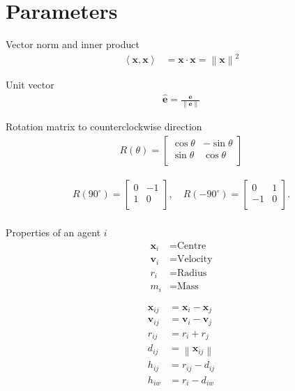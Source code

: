 \section{Parameters}

Vector norm and inner product
\begin{align}
\left\langle \mathbf{x}, \mathbf{x} \right\rangle &= \mathbf{x} \cdot \mathbf{x} = \left\| \mathbf{x}\right\|^{2}
\end{align}

Unit vector
\begin{align}
\hat{\mathbf{e}} = \frac{\mathbf{e}}{\left\|\mathbf{e}\right\|}
\end{align}

Rotation matrix to counterclockwise direction
\begin{align}
R(\theta) = \begin{bmatrix}\cos \theta & -\sin \theta \\\sin \theta & \cos \theta \\\end{bmatrix}
\end{align}

\begin{align}
R(90^{\circ}) = \begin{bmatrix}0 & -1 \\ 1 & 0 \\\end{bmatrix}, \quad R(-90^{\circ}) = \begin{bmatrix}0 & 1 \\ -1 & 0 \\\end{bmatrix}. \\
\end{align}

Properties of an agent $ i $
\begin{align}
\mathbf{x}_{i} &= \text{Centre} \\
\mathbf{v}_{i} &= \text{Velocity} \\
r_{i} &= \text{Radius} \\
m_{i} &= \text{Mass}
\end{align}

\begin{align}
\mathbf{x}_{ij} &= \mathbf{x}_{i} - \mathbf{x}_{j} \\
\mathbf{v}_{ij} &= \mathbf{v}_{i} - \mathbf{v}_{j} \\
r_{ij} &= r_{i} + r_{j} \\
d_{ij} &= \left\|\mathbf{x}_{ij}\right\| \\
h_{ij} &= r_{ij} - d_{ij} \\
h_{iw} &= r_{i} - d_{iw}
\end{align}

